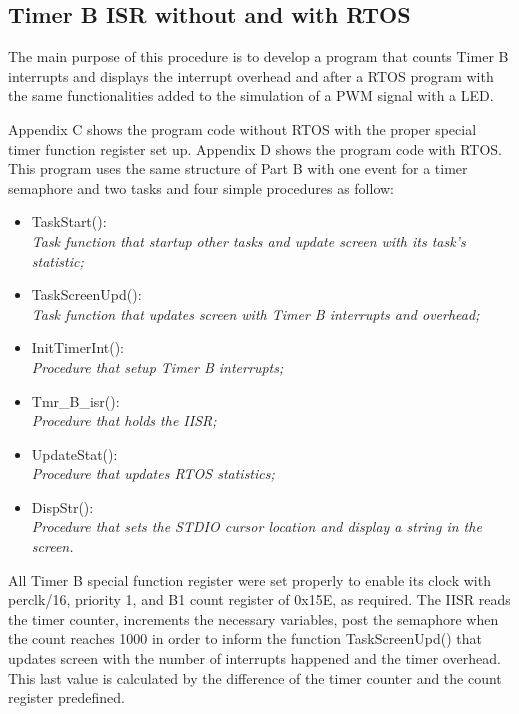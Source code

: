 \subsection{Timer B ISR without and with RTOS}

The main purpose of this procedure is to develop a program that counts Timer B interrupts and displays the interrupt overhead and after a RTOS program with the same functionalities added to the simulation of a PWM signal with a LED.

Appendix C shows the program code without RTOS with the proper special timer function register set up. Appendix D shows the program code with RTOS. This program uses the same structure of Part B with one event for a timer semaphore and two tasks and four simple procedures as follow:

\begin{itemize}[label={--}]
\item
TaskStart():
\\  \textit{Task function that startup other tasks and update screen with its task's statistic;}
\\
\item
TaskScreenUpd():
\\  \textit{Task function that updates screen with Timer B interrupts and overhead;}
\\
\item
InitTimerInt():
\\  \textit{Procedure that setup Timer B interrupts;}
\\
\item
Tmr\_B\_isr():
\\  \textit{Procedure that holds the IISR;}
\\
\item
UpdateStat():
\\  \textit{Procedure that updates RTOS statistics;}
\\
\item
DispStr():
\\  \textit{Procedure that sets the STDIO cursor location and display a string in the screen.}
\\
\end{itemize}

All Timer B special function register were set properly to enable its clock with perclk/16, priority 1, and B1 count register of 0x15E, as required. The IISR reads the timer counter, increments the necessary variables, post the semaphore when the count reaches 1000 in order to inform the function TaskScreenUpd() that updates screen with the number of interrupts happened and the timer overhead. This last value is calculated by the difference of the timer counter and the count register predefined.

